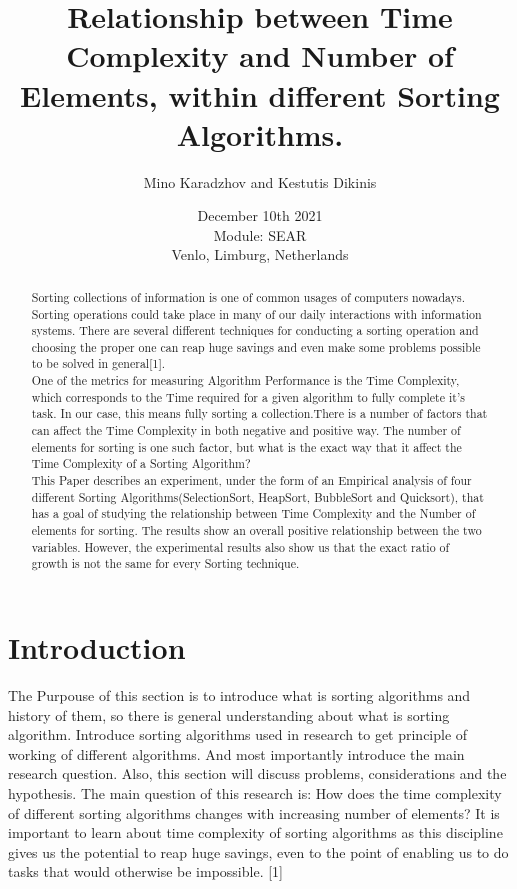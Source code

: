 \documentclass[]{report}
\title{Relationship between Time Complexity and Number of Elements, within different Sorting Algorithms.}
\author{Mino Karadzhov and Kestutis Dikinis}
\date{December 10th 2021 \\Module: SEAR \\Venlo, Limburg, Netherlands}
\begin{document}
\maketitle

\begin{abstract}
Sorting  collections of information is one of common usages of computers nowadays. Sorting operations could take place in many of our daily interactions with information systems. There are several different techniques for conducting a sorting operation and choosing the proper one can reap huge savings and even make some problems possible to be solved in general[1]. \\

One of the metrics for measuring Algorithm Performance is the Time Complexity, which corresponds to the Time required for a given algorithm to fully complete it's task. In our case, this means fully sorting a collection.There is a number of factors that can affect the Time Complexity in both negative and positive way. The number of elements for sorting is one such factor, but what is the exact way that it affect the Time Complexity of a Sorting Algorithm? \\

This Paper describes an experiment, under the form of an Empirical analysis of four different Sorting Algorithms(SelectionSort, HeapSort, BubbleSort and Quicksort), that has a goal of studying the relationship between Time Complexity and the Number of elements for sorting. The results show an overall positive relationship between the two variables. However, the experimental results also show us that the exact ratio of growth is not the same for every Sorting technique.

\end{abstract}

\tableofcontents
\setcounter{page}{3}
\listoffigures %
\pagebreak

	
\section{Introduction}
The Purpouse of this section is to introduce what is sorting algorithms and history of them, so there is general understanding about what is sorting algorithm. Introduce sorting algorithms used in research to get principle of working of different algorithms. And most importantly introduce the main research question. Also, this section will discuss problems, considerations and the hypothesis.
The main question of this research is: How does the time complexity of different sorting algorithms changes with increasing number of elements? It is important to learn about time complexity of sorting algorithms as this discipline gives us the potential to reap huge savings, even to the point of enabling us to do tasks that would otherwise be impossible. [1]
\end{document}
